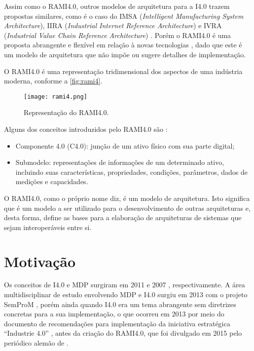 Assim como o RAMI4.0, outros modelos de arquitetura para a I4.0 trazem propostas similares, como é o caso do IMSA (\textit{Intelligent Manufacturing System Architecture}), IIRA (\textit{Industrial Internet Reference Architecture}) e IVRA (\textit{Industrial Value Chain Reference Architecture}) \cite{li2018architectures}. Porém o RAMI4.0 é uma proposta abrangente e flexível em relação à novas tecnologias \cite{hankel2015rami}, dado que este é um modelo de arquitetura que não impõe ou sugere detalhes de implementação.

O RAMI4.0 é uma representação tridimensional dos aspectos de uma indústria moderna, conforme a \autoref{fig:rami4}.

\begin{figure}[htb]
	\centering
	\texttt{[image: rami4.png]}
	\caption{Representação do RAMI4.0.}
	\label{fig:rami4}
\end{figure}

Alguns dos conceitos introduzidos pelo RAMI4.0 são \cite{bader2019aas}:

\begin{itemize}
	\item Componente 4.0 (C4.0): junção de um ativo físico com sua parte digital;
	\item Submodelo: representações de informações de um determinado ativo, incluindo suas características, propriedades, condições, parâmetros, dados de medições e capacidades.
\end{itemize}

O RAMI4.0, como o próprio nome diz, é um modelo de arquitetura. Isto significa que é um modelo a ser utilizado para o desenvolvimento de outras arquiteturas e, desta forma, define as bases para a elaboração de arquiteturas de sistemas que sejam interoperáveis entre si.

\section{Motivação}
\label{sec:motivacao}

Os conceitos de I4.0 e MDP surgiram em 2011 \cite{kagermann2011industrie} e 2007 \cite{wahlster2007digitalmemory}, respectivamente. A área multidisciplinar de estudo envolvendo MDP e I4.0 surgiu em 2013 com o projeto SemProM \cite{wahlster2013semprom}, porém ainda quando I4.0 era um tema abrangente sem diretrizes concretas para a sua implementação, o que ocorreu em 2013 por meio do documento de recomendações para implementação da iniciativa estratégica ``Industrie 4.0'' \cite{kagermann2013recommendations}, antes da criação do RAMI4.0, que foi divulgado em 2015 pelo periódico alemão de .


